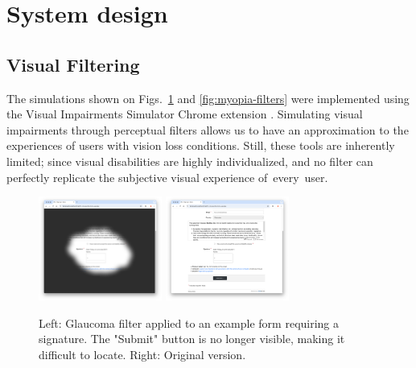 
\section{System design}
\subsection{Visual Filtering}

The simulations shown on Figs.~\ref{fig:glaucoma-filters} and \ref{fig:myopia-filters} were implemented using the Visual Impairments Simulator Chrome extension \cite{visual_impairments_simulator}. Simulating visual impairments through perceptual filters allows us to have an approximation to the experiences of users with vision loss conditions. Still, these tools are inherently limited; since visual disabilities are highly individualized, and no filter can perfectly replicate the subjective visual experience of~every~user.

\begin{figure}
    \centering
    \includegraphics[width=115pt]{imgs/glaucoma-filter.png}
    \includegraphics[width=115pt]{imgs/no-glaucoma-filter.png}
    \caption{Left: Glaucoma filter applied to an example form requiring a signature. The "Submit" button is no longer visible, making it difficult to locate. Right: Original version.}
    \vspace{-13pt}
    \label{fig:glaucoma-filters}
\end{figure}

